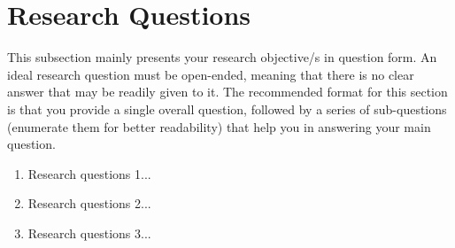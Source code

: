 \section{Research Questions}

This subsection mainly presents your research objective/s in question form. An ideal research question must be open-ended, meaning that there is no clear answer that may be readily given to it. The recommended format for this section is that you provide a single overall question, followed by a series of sub-questions (enumerate them for better readability) that help you in answering your main question.

\begin{enumerate}
    \item Research questions 1...
    \item Research questions 2...
    \item Research questions 3...
\end{enumerate}